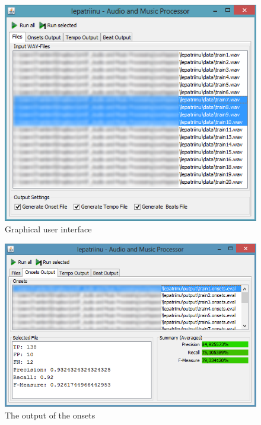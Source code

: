 \begin{figure}[htp]
\begin{center}
  \includegraphics[width=\textwidth]{chapter/gui}
  \caption{Graphical user interface}
  \label{fig:gui}
\end{center}
\end{figure}

\begin{figure}[htp]
  \centering
  \includegraphics[width=\textwidth]{chapter/GUIOutput}
  \caption{The output of the onsets}
  \label{fig:guioutput}
\end{figure}